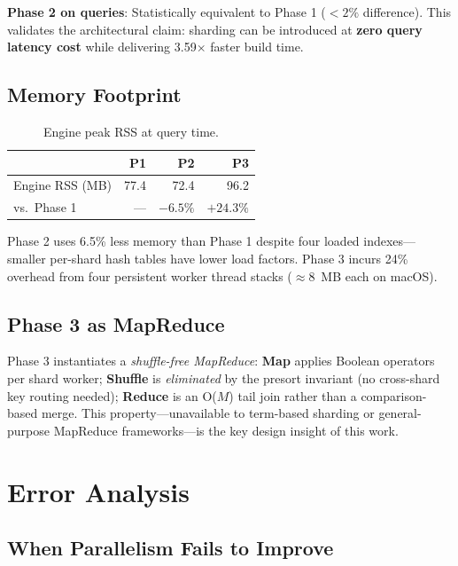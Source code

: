 \documentclass[twocolumn, 10pt]{article}
\begin{document}
\textbf{Phase 2 on queries}: Statistically equivalent to Phase 1
($<2\%$ difference). This validates the architectural claim: sharding
can be introduced at \textbf{zero query latency cost} while delivering
3.59$\times$ faster build time.

\subsection{Memory Footprint}

\begin{table}[H]
\centering
\caption{Engine peak RSS at query time.}
\label{tab:mem}
\begin{tabular}{lrrr}
\toprule
 & \textbf{P1} & \textbf{P2} & \textbf{P3} \\
\midrule
Engine RSS (MB) & 77.4 & 72.4 & 96.2 \\
vs.\ Phase 1    & --- & $-6.5\%$ & $+24.3\%$ \\
\bottomrule
\end{tabular}
\end{table}

Phase 2 uses 6.5\% less memory than Phase 1 despite four loaded
indexes---smaller per-shard hash tables have lower load factors. Phase 3
incurs 24\% overhead from four persistent worker thread stacks
($\approx$8~MB each on macOS).

\subsection{Phase 3 as MapReduce}

Phase 3 instantiates a \textit{shuffle-free MapReduce}:
\textbf{Map} applies Boolean operators per shard worker;
\textbf{Shuffle} is \textit{eliminated} by the presort invariant (no
cross-shard key routing needed);
\textbf{Reduce} is an O($M$) tail join rather than a comparison-based
merge. This property---unavailable to term-based sharding or general-purpose
MapReduce frameworks---is the key design insight of this work.

\section{Error Analysis}

\subsection{When Parallelism Fails to Improve}
\end{document}
